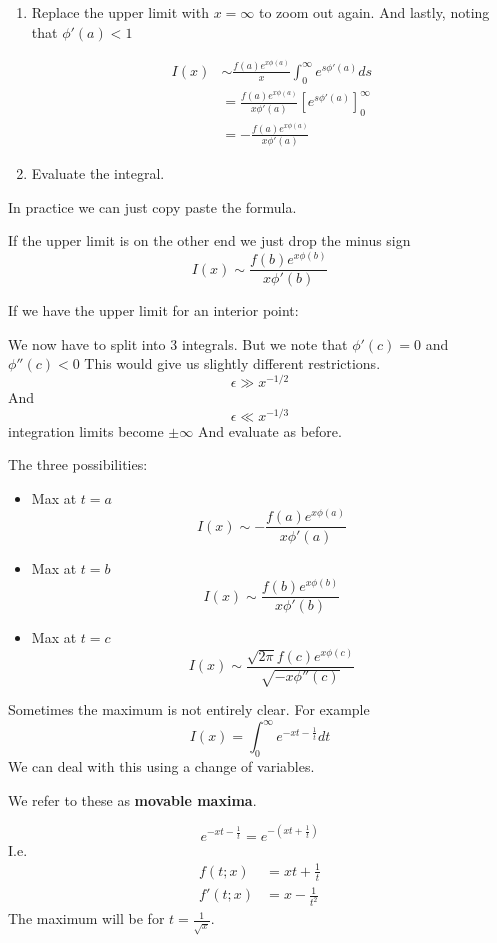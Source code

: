 \documentclass{X:/Documents/Coding/Latex/myassignment}
\begin{document}
\begin{enumerate}
    \item Replace the upper limit with $x=\infty$ to zoom out again.
    And lastly, noting that $\phi'(a) < 1$
    
    \begin{align*}
        I(x) &\sim \frac{f(a) e^{x\phi(a)}}{x} \int_0^{\infty} e^{s\phi'(a)} ds\\
        &= \frac{f(a) e^{x\phi(a)}}{x \phi'(a)} \left[e^{s\phi'(a)}\right] _0^\infty\\
        &= -\frac{f(a) e^{x\phi(a)}}{x \phi'(a)}
    \end{align*}

    \item Evaluate the integral.
\end{enumerate}

In practice we can just copy paste the formula.

If the upper limit is on the other end we just drop the minus sign
\[I(x) \sim \frac{f(b) e^{x\phi(b)}}{x \phi'(b)}\]

If we have the upper limit for an interior point:

We now have to split into 3 integrals. But we note that $\phi'(c) = 0$ and $\phi''(c) < 0$
This would give us slightly different restrictions.
\[\epsilon \gg x^{-1/2}\]
And
\[\epsilon \ll x^{-1/3}\]
integration limits become $\pm \infty$
And evaluate as before.

The three possibilities:
\begin{itemize}
    \item Max at $t=a$
    \[I(x) \sim -\frac{f(a) e^{x\phi(a)}}{x \phi'(a)}\]
    \item Max at $t=b$
    \[I(x) \sim \frac{f(b) e^{x\phi(b)}}{x \phi'(b)}\]
    \item Max at $t=c$
    \[I(x) \sim \frac{\sqrt{2\pi} f(c) e^{x\phi(c)}}{\sqrt{-x\phi''(c)}}\]
\end{itemize}


Sometimes the maximum is not entirely clear. For example
\[I(x) = \int_0^\infty e^{-xt - \frac1t} dt\]
We can deal with this using a change of variables.

We refer to these as \textbf{movable maxima}.

\[
    e^{-xt - \frac1t} = e^{-(xt + \frac1t)}
\]
I.e.
\begin{align*}
    f(t;x) &= xt + \frac1t\\
    f'(t;x) &= x - \frac1{t^2}
\end{align*}
The maximum will be for $t = \frac{1}{\sqrt{x}}$. 
\end{document}
